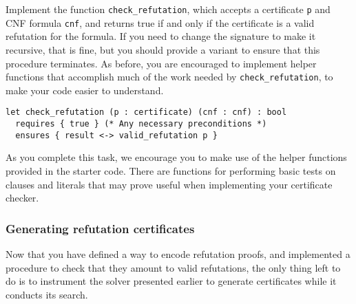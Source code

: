 \documentclass[11pt]{article}
\begin{document}
\begin{task}[20 points]
Implement the function \verb'check_refutation', which accepts a certificate \verb'p' and CNF formula \verb'cnf', and returns true if and only if the certificate is a valid refutation for the formula.
If you need to change the signature to make it recursive, that is fine, but you should provide a variant to ensure that this procedure terminates.
As before, you are encouraged to implement helper functions that accomplish much of the work needed by \verb'check_refutation', to make your code easier to understand.

\begin{lstlisting}
let check_refutation (p : certificate) (cnf : cnf) : bool
  requires { true } (* Any necessary preconditions *)
  ensures { result <-> valid_refutation p }
\end{lstlisting}
\end{task}

As you complete this task, we encourage you to make use of the helper functions provided in the starter code.
There are functions for performing basic tests on clauses and literals that may prove useful when implementing your certificate checker.

\subsubsection*{Generating refutation certificates}

Now that you have defined a way to encode refutation proofs, and implemented a procedure to check that they amount to valid refutations, the only thing left to do is to instrument the solver presented earlier to generate certificates while it conducts its search.
\end{document}
